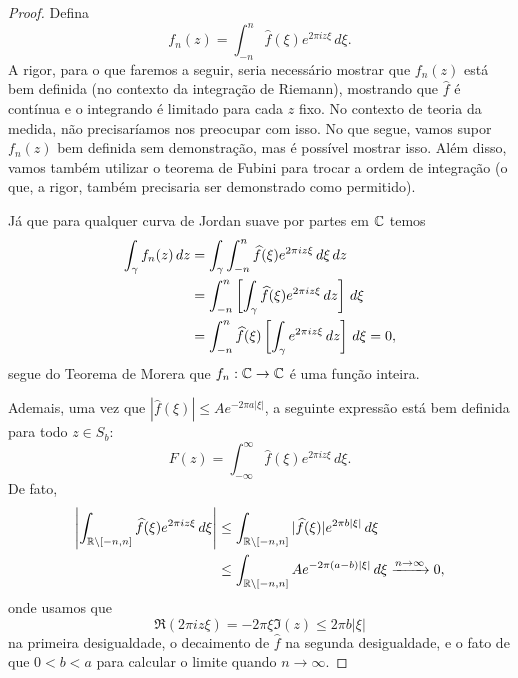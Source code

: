         \begin{proof}
            Defina
            \begin{equation*}
                f_n(z) = \int_{-n}^{n} \widehat{f}(\xi) e^{2\pi iz\xi} \, d\xi.
            \end{equation*}
            A rigor, para o que faremos a seguir, seria necessário mostrar que $f_n(z)$ está bem
            definida (no contexto da integração de Riemann), mostrando que $\widehat{f}$ é contínua
            e o integrando é limitado para cada $z$ fixo. No contexto de teoria da medida, 
            não precisaríamos nos preocupar com isso. No que segue, vamos supor $f_n(z)$ bem 
            definida sem demonstração, mas é possível mostrar isso. Além disso, vamos
            também utilizar o teorema de Fubini para trocar a ordem de integração 
            (o que, a rigor, também precisaria ser demonstrado como permitido).
            
            Já que para qualquer curva de Jordan suave por partes em $\mathbb{C}$ temos
            \begin{align*}
                \int_{\gamma} f_n(z) \, dz &= \int_{\gamma} \int_{-n}^n \widehat{f}(\xi) e^{2\pi iz\xi} \, d\xi \, dz \\
                                       &= \int_{-n}^n \left[ \int_{\gamma} \widehat{f}(\xi)e^{2\pi iz\xi} \, dz 
                                        \right] \, d\xi \\
                                       &= \int_{-n}^n \widehat{f}(\xi) \left[ \int_{\gamma} e^{2\pi iz\xi} \, dz
                                       \right] \, d\xi = 0,
            \end{align*}
            segue do Teorema de Morera que $f_n:\mathbb{C}\to\mathbb{C}$ é uma função inteira.
            
            Ademais, uma vez que $|\widehat{f}(\xi)| \leq Ae^{-2\pi a|\xi|}$, a seguinte expressão 
            está bem definida para todo $z\in S_b$:
            \begin{equation*}
                F(z) = \int_{-\infty}^{\infty} \widehat{f}(\xi) e^{2\pi iz\xi} \, d\xi.
            \end{equation*}
            De fato,
            \begin{align*}
                \left| \int_{\mathbb{R}\setminus [-n,n]} \widehat{f}(\xi) e^{2\pi iz\xi} \, d\xi \right|
                &\leq \int_{\mathbb{R}\setminus [-n,n]} |\widehat{f}(\xi)|e^{2\pi b|\xi|} \, d\xi \\
                &\leq \int_{\mathbb{R}\setminus [-n,n]} Ae^{-2\pi (a-b)|\xi|} \, d\xi \xrightarrow{n\to\infty} 0,
            \end{align*}
            onde usamos que
            \begin{equation*}
                \Re(2\pi iz\xi) = -2\pi\xi\Im(z) \leq 2\pi b|\xi|
            \end{equation*}
            na primeira desigualdade, o decaimento de $\widehat{f}$ na segunda desigualdade, e
            o fato de que $0<b<a$ para calcular o limite quando $n\to\infty$.
            

\end{proof}
